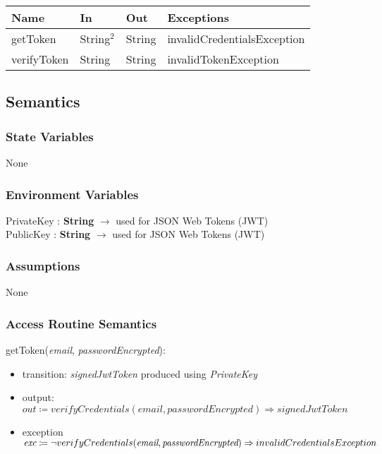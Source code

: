 \documentclass[12pt, titlepage]{article}
\begin{document}
\begin{center}
\begin{tabular}{p{5cm} p{3cm} p{3cm} p{5cm}}
\hline
\textbf{Name} & \textbf{In} & \textbf{Out} & \textbf{Exceptions} \\
\hline
getToken & String$^2$ & String & invalidCredentialsException \\
verifyToken & String & String & invalidTokenException \\
\hline
\end{tabular}
\end{center}

\subsection{Semantics}

\subsubsection{State Variables}
None

\subsubsection{Environment Variables}
PrivateKey : \textbf{String} $\rightarrow$ used for JSON Web Tokens (JWT) \\
PublicKey : \textbf{String} $\rightarrow$ used for JSON Web Tokens (JWT)

\subsubsection{Assumptions}
None

\subsubsection{Access Routine Semantics}

\noindent getToken(\textit{email}, \textit{passwordEncrypted}):
\begin{itemize}
\item transition: \textit{signedJwtToken} produced using \textit{PrivateKey}
\item output: \( \textit{out} \coloneqq verifyCredentials(\textit{email}, \textit{passwordEncrypted}) \Rightarrow  signedJwtToken\) 
\item exception \( \textit{exc} \coloneqq \neg verifyCredentials(\textit{email}, \textit{passwordEncrypted}) \Rightarrow \\ invalidCredentialsException\)
\end{itemize}
\end{document}
